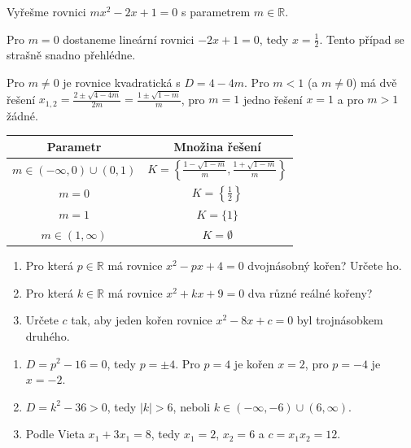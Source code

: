 \begin{example}
  Vyřešme rovnici $mx^2 - 2x + 1 = 0$ s parametrem $m\in\mathbb{R}$.

  Pro $m = 0$ dostaneme lineární rovnici $-2x + 1 = 0$, tedy $x = \frac{1}{2}$. Tento případ se strašně snadno přehlédne.

  Pro $m\neq 0$ je rovnice kvadratická s $D = 4 - 4m$. Pro $m < 1$ (a $m\neq 0$) má dvě řešení $x_{1,2} = \frac{2\pm\sqrt{4 - 4m}}{2m} = \frac{1\pm\sqrt{1 - m}}{m}$, pro $m = 1$ jedno řešení $x = 1$ a pro $m > 1$ žádné.
  \begin{center}
    \renewcommand{\arraystretch}{1.4}
    \begin{tabular}{|c|c|}
      \hline
      Parametr & Množina řešení \\
      \hline
      $m\in(-\infty, 0)\cup(0, 1)$ & $K = \left\{\frac{1 - \sqrt{1 - m}}{m}, \frac{1 + \sqrt{1 - m}}{m}\right\}$ \\
      $m = 0$ & $K = \left\{\frac{1}{2}\right\}$ \\
      $m = 1$ & $K = \{1\}$ \\
      $m\in(1, \infty)$ & $K = \emptyset$ \\
      \hline
    \end{tabular}
  \end{center}
\end{example}

\begin{problem}
  \begin{enumerate}[label=(\alph*)]
    \item Pro která $p\in\mathbb{R}$ má rovnice $x^2 - px + 4 = 0$ dvojnásobný kořen? Určete ho.
    \item Pro která $k\in\mathbb{R}$ má rovnice $x^2 + kx + 9 = 0$ dva různé reálné kořeny?
    \item Určete $c$ tak, aby jeden kořen rovnice $x^2 - 8x + c = 0$ byl trojnásobkem druhého.
  \end{enumerate}
\end{problem}

\begin{solution}
  \begin{enumerate}[label=(\alph*)]
    \item $D = p^2 - 16 = 0$, tedy $p = \pm 4$. Pro $p = 4$ je kořen $x = 2$, pro $p = -4$ je $x = -2$.
    \item $D = k^2 - 36 > 0$, tedy $|k| > 6$, neboli $k\in(-\infty, -6)\cup(6, \infty)$.
    \item Podle Vieta $x_1 + 3x_1 = 8$, tedy $x_1 = 2$, $x_2 = 6$ a $c = x_1x_2 = 12$.
  \end{enumerate}
\end{solution}

